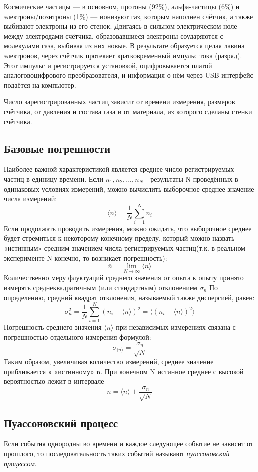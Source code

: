 \documentclass[a4paper]{article}
\begin{document}
Космические частицы — в основном, протоны (92\%), альфа-частицы
(6\%) и электроны/позитроны (1\%) — ионизуют газ, которым наполнен счётчик, а также выбивают электроны из его стенок. Двигаясь в сильном электрическом ноле между электродами счётчика, образовавшиеся электроны соударяются с молекулами газа, выбивая из них новые. В результате образуется целая лавина электронов, через счётчик протекает кратковременный импульс тока (разряд). Этот импульс и регистрируется установкой, оцифровывается платой аналоговоцифрового преобразователя, и информация о нём через USB интерфейс подаётся на компьютер.\par

Число зарегистрированных частиц зависит от времени измерения, размеров счётчика, от давления и состава газа и от материала, из которого сделаны стенки счётчика.

\subsection{Базовые погрешности}
Наиболее важной характеристикой является среднее число регистрируемых частиц в единицу времени. Если $n_{1}, n_{2}, ..., n_{N}$ - результаты N проведённых в одинаковых условиях измерений, можно вычислить выборочное среднее значение числа измерений:
\[\langle n \rangle = \frac{1}{N}\sum\limits_{i=1}^{N} n_{i}\]
Если продолжать проводить измерения, можно ожидать, что выборочное среднее будет стремиться к некоторому конечному пределу, который можно назвать «истинным» средним значением числа регистрируемых частиц(т.к. в реальном эксперименте N конечно, то возникает погрешность):
\[\overline{n} = \lim_{N \to \infty} \langle n \rangle\]
Количественно меру флуктуаций среднего значения от опыта к опыту принято измерять среднеквадратичным (или стандартным) отклонением $\sigma_{n}$
По определению, средний квадрат отклонения, называемый также дисперсией, равен:
\[\sigma_{n}^2 = \frac{1}{N}\sum\limits_{i=1}^{N} (n_{i} - \langle n \rangle)^2 = \langle (n_{i} - \langle n \rangle)^2 \rangle\]
Погрешность среднего значения $\langle n \rangle$ при независимых измерениях связана с погрешностью отдельного измерения формулой:
\[\sigma_{\langle n \rangle} = \frac{\sigma_{n}}{\sqrt{N}}\]
Таким образом, увеличивая количество измерений, среднее значение приближается к «истинному» n. При конечном N истинное среднее с высокой вероятностью лежит в интервале 
\[\overline{n} = \langle n \rangle \pm \frac{\sigma_{n}}{\sqrt{N}}\]

\subsection{Пуассоновский процесс}
Если события однородны во времени и каждое следующее событие не зависит от прошлого, то последовательность таких событий называют \textit{пуассоновский процессом}.\newline
\end{document}
